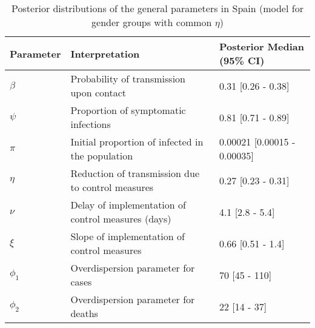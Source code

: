 \begin{table}[ht]
\centering
\begin{tabular}{lp{9cm}p{3cm}}
  \hline
Parameter & Interpretation & Posterior Median (95\% CI) \\ 
  \hline
$\beta$ & Probability of transmission upon contact & 0.31 [0.26 - 0.38] \\ 
  $\psi$ & Proportion of symptomatic infections & 0.81 [0.71 - 0.89] \\ 
  $\pi$ & Initial proportion of infected in the population & 0.00021 [0.00015 - 0.00035] \\ 
  $\eta$ & Reduction of transmission due to control measures & 0.27 [0.23 - 0.31] \\ 
  $\nu$ & Delay of implementation of control measures (days) & 4.1 [2.8 - 5.4] \\ 
  $\xi$ & Slope of implementation of control measures & 0.66 [0.51 - 1.4] \\ 
  $\phi_1$ & Overdispersion parameter for cases & 70 [45 - 110] \\ 
  $\phi_2$ & Overdispersion parameter for deaths & 22 [14 - 37] \\ 
   \hline
\end{tabular}
\caption{Posterior distributions of the general parameters in Spain (model for gender groups with common $\eta$)} 
\label{tab:ParamTableSpain_Gender_CommonEta}
\end{table}
